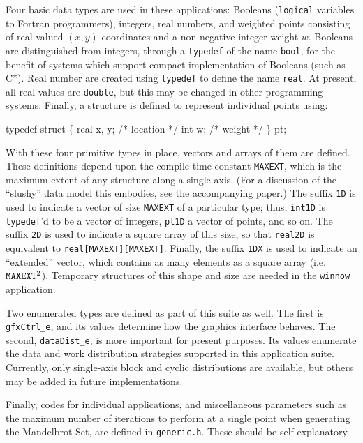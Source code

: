 Four basic data types are used in these applications:
Booleans ({\tt{logical}} variables to Fortran programmers),
integers,
real numbers,
and weighted points consisting of real-valued $(x,y)$ coordinates
and a non-negative integer weight $w$.
Booleans are distinguished from integers,
through a {\tt{typedef}} of the name {\tt{bool}},
for the benefit of systems which support compact implementation of Booleans
(such as C*).
Real number are created using {\tt{typedef}} to define the name {\tt{real}}.
At present,
all real values are {\tt{double}},
but this may be changed in other programming systems.
Finally,
a structure is defined to represent individual points using:
\begin{progtext}
    typedef struct \{
      real  x, y;        /* location */
      int   w;           /* weight */
    \} pt;
\end{progtext}
With these four primitive types in place,
vectors and arrays of them are defined.
These definitions depend upon the compile-time constant {\tt{MAXEXT}},
which is the maximum extent of any structure along a single axis.
(For a discussion of the ``slushy'' data model this embodies,
see the accompanying paper.)
The suffix {\tt{1D}} is used to indicate a vector of size {\tt{MAXEXT}}
of a particular type;
thus,
{\tt{int1D}} is {\tt{typedef}}'d to be a vector of integers,
{\tt{pt1D}} a vector of points,
and so on.
The suffix {\tt{2D}} is used to indicate a square array of this size,
so that {\tt{real2D}} is equivalent to {\tt{real[MAXEXT][MAXEXT]}}.
Finally,
the suffix {\tt{1DX}} is used to indicate an ``extended'' vector,
which contains as many elements as a square array
(i.e.\ ${\tt{MAXEXT}}^2$).
Temporary structures of this shape and size are needed in the {\tt{winnow}} application.

Two enumerated types are defined as part of this suite as well.
The first is {\tt{gfxCtrl\_e}},
and its values determine how the graphics interface behaves.
The second,
{\tt{dataDist\_e}},
is more important for present purposes.
Its values enumerate the data and work distribution strategies
supported in this application suite.
Currently,
only single-axis block and cyclic distributions are available,
but others may be added in future implementations.

Finally,
codes for individual applications,
and miscellaneous parameters
such as the maximum number of iterations to perform at a single point
when generating the Mandelbrot Set,
are defined in {\tt{generic.h}}.
These should be self-explanatory.

